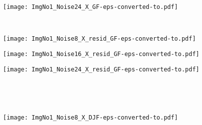 \documentclass{article}
\begin{document}
\begin{figure*}[th]
\begin{multicols}{2}
\begin{minipage}[b]{0.28\linewidth}
		\end{minipage} 
		\begin{minipage}[b]{0.28\linewidth}
			\centering
			\texttt{[image: ImgNo1\_Noise24\_X\_GF-eps-converted-to.pdf]}
		\end{minipage} 
		\\
		\begin{minipage}[b]{0.1\linewidth}
		\end{minipage} 
		\begin{minipage}[b]{0.28\linewidth}
			\centering
			\texttt{[image: ImgNo1\_Noise8\_X\_resid\_GF-eps-converted-to.pdf]}
		\end{minipage} 
		\begin{minipage}[b]{0.28\linewidth}
			\centering
			\texttt{[image: ImgNo1\_Noise16\_X\_resid\_GF-eps-converted-to.pdf]}
		\end{minipage} 
		\begin{minipage}[b]{0.28\linewidth}
			\centering
			\texttt{[image: ImgNo1\_Noise24\_X\_resid\_GF-eps-converted-to.pdf]}
		\end{minipage} 
		\\
		\begin{minipage}[b]{0.1\linewidth}
			\centering	%
		\end{minipage}
		\begin{minipage}[b]{0.28\linewidth}
		\end{minipage} 
		\begin{minipage}[b]{0.28\linewidth}
		\end{minipage} 
		\begin{minipage}[b]{0.28\linewidth}
		\end{minipage}
		\\
		\begin{minipage}[b]{0.1\linewidth}
		\end{minipage} 
		\begin{minipage}[b]{0.28\linewidth}
			\centering
			\texttt{[image: ImgNo1\_Noise8\_X\_DJF-eps-converted-to.pdf]}
		\end{minipage} 
		\begin{minipage}[b]{0.28\linewidth}

\end{minipage}
\end{multicols}
\end{figure*}
\end{document}
